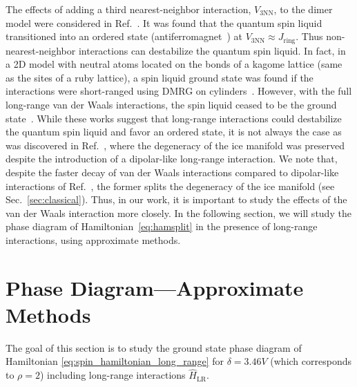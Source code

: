 \documentclass[twocolumn,superscriptaddress,amsmath,amssymb,aps,prx,nofootinbib]{revtex4-2}
\begin{document}
  The effects of adding a third nearest-neighbor interaction, $V_{\text{3NN}}$, to the dimer model were considered in Ref.~\cite{pace2021}. It was found that the quantum spin liquid transitioned into an ordered state (antiferromagnet~\cite{chen2016magnetic}) at $V_{\text{3NN}} \approx J_{\text{ring}}$. 
  Thus non-nearest-neighbor interactions can destabilize the quantum spin liquid.
  In fact, in a 2D model with neutral atoms located on the bonds of a kagome lattice (same as the sites of a ruby lattice), a spin liquid ground state was found if the interactions were short-ranged using DMRG on cylinders~\cite{verresen2021,semeghini2021}. However, with the full long-range van der Waals interactions, the spin liquid ceased to be the ground state~\cite{verresen2021,semeghini2021}. 
While these works suggest that long-range interactions could destabilize the quantum spin liquid and favor an ordered state, it is not always the case as was discovered in Ref.~\cite{isakov2005why}, where the degeneracy of the ice manifold was preserved despite the introduction of a dipolar-like long-range interaction.
  We note that, despite the faster decay of van der Waals interactions compared to dipolar-like interactions of Ref.~\cite{isakov2005why}, the former splits the degeneracy of the ice manifold (see Sec.~\ref{sec:classical}).
Thus, in our work, it is important to study the effects of the van der Waals interaction more closely.
  In the following section, we will study the phase diagram of Hamiltonian~\eqref{eq:hamsplit} in the presence of long-range interactions, using approximate methods. 

\section{Phase Diagram---Approximate Methods}\label{sec:meanfield}
The goal of this section is to study the ground state phase diagram of Hamiltonian \eqref{eq:spin_hamiltonian_long_range} for $\delta = 3.46 V$ (which corresponds to $\rho = 2$) including long-range interactions $\hat{H}_{\text{LR}}$.
\end{document}
